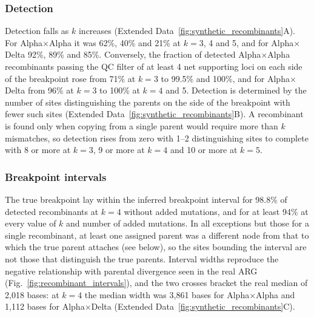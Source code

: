 \documentclass[12pt]{article}
\newcommand{\figref}[1]{Fig.~\ref{#1}}
\newcommand{\edref}[1]{Extended Data~\ref{#1}}
\begin{document}
\subsubsection{Detection}
Detection falls as $k$ increases (\edref{fig:synthetic_recombinants}A).
For Alpha$\times$Alpha it was 62\%, 40\% and 21\% at $k=3$, 4 and 5,
and for Alpha$\times$Delta 92\%, 89\% and 85\%.
Conversely, the fraction of detected Alpha$\times$Alpha recombinants
passing the QC filter of at least 4 net supporting loci on each side
of the breakpoint rose from 71\% at $k=3$ to 99.5\% and 100\%,
and for Alpha$\times$Delta from 96\% at $k=3$ to 100\% at $k=4$ and 5.
Detection is determined by the number of sites distinguishing
the parents on the side of the breakpoint with fewer such sites
(\edref{fig:synthetic_recombinants}B).
A recombinant is found only when copying from a single parent
would require more than $k$ mismatches, so detection
rises from zero with 1--2 distinguishing sites to complete
with 8 or more at $k=3$, 9 or more at $k=4$
and 10 or more at $k=5$.

\subsubsection{Breakpoint intervals}
The true breakpoint lay within the inferred breakpoint interval
for 98.8\% of detected recombinants at $k=4$ without added mutations,
and for at least 94\% at every value of $k$ and number of added mutations.
In all exceptions but those for a single recombinant,
at least one assigned parent was a different node
from that to which the true parent attaches (see below),
so the sites bounding the interval are not those that distinguish the true parents.
Interval widths reproduce the negative relationship with parental divergence
seen in the real ARG (\figref{fig:recombinant_intervals}),
and the two crosses bracket the real median of 2,018 bases:
at $k=4$ the median width was 3,861 bases for Alpha$\times$Alpha
and 1,112 bases for Alpha$\times$Delta
(\edref{fig:synthetic_recombinants}C).
\end{document}
